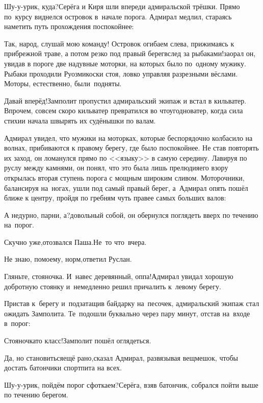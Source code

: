 \diagdash Шу-у-урик, куда?\mdash Серёга и Киря шли впереди адмиральской трёшки. Прямо по~курсу виднелся островок в~начале порога. Адмирал медлил, стараясь наметить путь прохождения поспокойнее:

\diagdash Так, народ, слушай мою команду! Островок огибаем слева, прижимаясь к прибрежной траве, а потом резко под правый берег\mdash вслед за рыбаками!\mdash заорал он, увидав в пороге две надувные моторки, на которых было по~одному мужику. Рыбаки проходили Руозмикоски стоя, ловко управляя разрезными вёслами. Моторы, естественно, были~подняты.

\diagdash Давай вперёд!\mdash Замполит пропустил адмиральский экипаж и встал в кильватер. Впрочем, совсем скоро кильватер превратился во что\sdash угодно\sdash ватер, когда сила стихии начала швырять их судёнышки по валам.

Адмирал увидел, что мужики на моторках, которые беспорядочно колбасило на волнах, прибиваются к правому берегу, где было поспокойнее. Не став повторять их заход, он ломанулся прямо по <<языку>> в самую середину. Лавируя по руслу между камнями, он понял, что это была лишь прелюдия\mdash его взору открылась вторая ступень порога с мощным широким сливом. Моторочники, балансируя на~ногах, ушли под самый правый берег, а~Адмирал опять пошёл ближе к центру, пройдя по гребням чуть правее самых больших валов:

\diagdash А недурно, парни, а?\mdash довольный собой, он обернулся поглядеть вверх по течению на~порог.

\diagdash Скучно уже,\mdash отозвался Паша.\mdash Не~то что~вчера.

\diagdash Не знаю, по\sdash моему, норм,\mdash ответил Руслан.

\diagdash Гляньте, стояночка. И~навес деревянный, оп\sdash па!\mdash Адмирал увидал хорошую добротную стоянку и~немедленно решил причалить к~левому берегу.

Пристав к~берегу и~подзатащив байдарку на~песочек, адмиральский экипаж стал ожидать Замполита. Те~подошли буквально через пару минут, отстав на~входе в~порог:

\diagdash Стояночка\sdash то класс!\mdash Замполит пошёл оглядеться.

\diagdash Да, но становиться\mdash ещё рано,\mdash сказал Адмирал, развязывая вещмешок, чтобы достать батончики спортпита на всех.

\diagdash Шу-у-урик, пойдём порог сфоткаем?\mdash Серёга, взяв батончик, собрался пойти выше по течению берегом.

